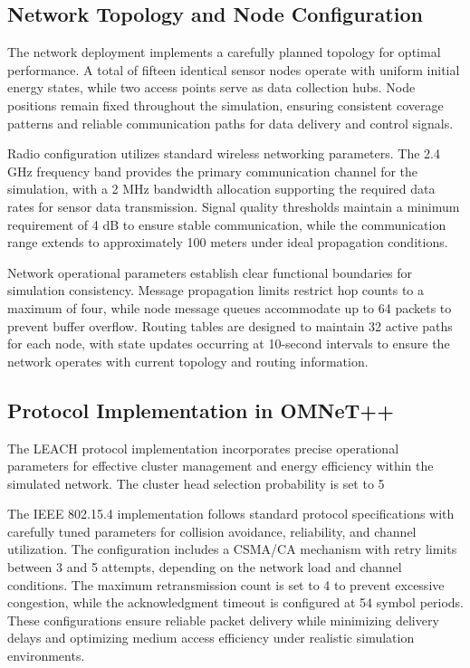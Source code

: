 \documentclass[conference]{IEEEtran}
\begin{document}
\subsection{Network Topology and Node Configuration}
The network deployment implements a carefully planned topology for optimal performance. A total of fifteen identical sensor nodes operate with uniform initial energy states, while two access points serve as data collection hubs. Node positions remain fixed throughout the simulation, ensuring consistent coverage patterns and reliable communication paths for data delivery and control signals.

Radio configuration utilizes standard wireless networking parameters. The 2.4 GHz frequency band provides the primary communication channel for the simulation, with a 2 MHz bandwidth allocation supporting the required data rates for sensor data transmission. Signal quality thresholds maintain a minimum requirement of 4 dB to ensure stable communication, while the communication range extends to approximately 100 meters under ideal propagation conditions.

Network operational parameters establish clear functional boundaries for simulation consistency. Message propagation limits restrict hop counts to a maximum of four, while node message queues accommodate up to 64 packets to prevent buffer overflow. Routing tables are designed to maintain 32 active paths for each node, with state updates occurring at 10-second intervals to ensure the network operates with current topology and routing information.

\subsection{Protocol Implementation in OMNeT++}
The LEACH protocol implementation incorporates precise operational parameters for effective cluster management and energy efficiency within the simulated network. The cluster head selection probability is set to 5%

The IEEE 802.15.4 implementation follows standard protocol specifications with carefully tuned parameters for collision avoidance, reliability, and channel utilization. The configuration includes a CSMA/CA mechanism with retry limits between 3 and 5 attempts, depending on the network load and channel conditions. The maximum retransmission count is set to 4 to prevent excessive congestion, while the acknowledgment timeout is configured at 54 symbol periods. These configurations ensure reliable packet delivery while minimizing delivery delays and optimizing medium access efficiency under realistic simulation environments.
\end{document}
